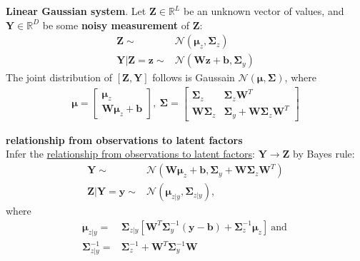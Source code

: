 \textbf{Linear Gaussian system}.
Let $\bm{Z}\in\mathbb{R}^L$ be an unknown vector of values, 
and $\bm{Y}\in\mathbb{R}^D$ be some \textbf{noisy measurement} of $\bm{Z}$:
\begin{align}
    \bm{Z}
    \sim& \mathcal{N}(\bm{\mu}_z,\bm{\Sigma}_z)\\
    \bm{Y}|\bm{Z}=\bm{z}
    \sim& \mathcal{N}(\bm{Wz}+\bm{b},\bm{\Sigma}_y)
\end{align}
The joint distribution of $[\bm{Z},\bm{Y}]$ follows is Gaussain 
$\mathcal{N}(\bm{\mu},\bm{\Sigma})$, where
\begin{gather}
    \bm{\mu}
    = \left[\begin{array}{c}
        \bm{\mu}_z \\
        \bm{W\mu}_z+\bm{b} 
    \end{array}\right],~
    \bm{\Sigma}
    = \left[\begin{array}{cc}
        \bm{\Sigma}_z & \bm{\Sigma}_z\bm{W}^T \\
        \bm{W\Sigma}_z & \bm{\Sigma}_y+\bm{W\Sigma}_z\bm{W}^T
    \end{array}\right]
\end{gather}

\begin{example}
    \textbf{relationship from observations to latent factors}\\
    Infer the \uline{relationship from observations to latent factors}: $\bm{Y}\to\bm{Z}$ by Bayes rule:
    \begin{align}
        \bm{Y}
        \sim& \mathcal{N}(\bm{W\mu}_z+\bm{b},\bm{\Sigma}_y+\bm{W\Sigma}_z\bm{W}^T)\\
        \bm{Z}|\bm{Y}=\bm{y}
        \sim& \mathcal{N}(\bm{\mu}_{z|y},\bm{\Sigma}_{z|y}),
    \end{align}
    where
    \begin{align}
        \bm{\mu}_{z|y}
        =& \bm{\Sigma}_{z|y}\left[
            \bm{W}^T\bm{\Sigma}_y^{-1}(\bm{y}-\bm{b})+\bm{\Sigma}_z^{-1}\bm{\mu}_z
        \right]~\text{and}~\\
        \bm{\Sigma}_{z|y}^{-1}
        =& \bm{\Sigma}_z^{-1}+\bm{W}^T\bm{\Sigma}_y^{-1}\bm{W}
    \end{align}
\end{example}


